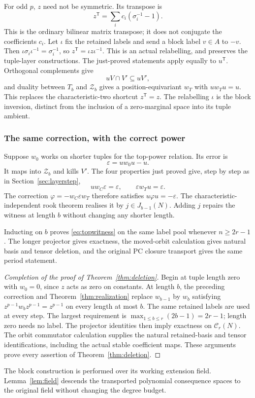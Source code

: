 For odd $p$, $z$ need not be symmetric. Its transpose is
\[z^{\mathsf T}=\sum_i c_i(\sigma_i^{-1}-1).
\]
This is the ordinary bilinear matrix transpose; it does not conjugate
the coefficients $c_i$.
Let $\iota$ fix the retained labels and send a block label $v\in A$ to $-v$. Then $\iota\sigma_i\iota^{-1}=\sigma_i^{-1}$, so $z^{\mathsf T}=\iota z\iota^{-1}$. This is an actual relabelling, and preserves the tuple-layer constructions. The just-proved statements apply equally to $u^{\mathsf T}$. Orthogonal complements give
\[uV\cap V'\subseteq uV',
\]
and duality between $T_b$ and $\mathcal Z_b$ gives a position-equivariant $w_T$ with $uw_Tu=u$. This replaces the characteristic-two shortcut $z^{\mathsf T}=z$.
The relabelling $\iota$ is the block inversion, distinct from the
inclusion of a zero-marginal space into its tuple ambient.

\subsubsection{The same correction, with the correct power}
Suppose $w_0$ works on shorter tuples for the top-power relation. Its error is
\[\varepsilon=uw_0u-u.
\]
It maps into $\mathcal Z_b$ and kills $V'$. The four properties just proved give, step by step as in Section~\ref{sec:layerstep},
\[uw_C\varepsilon=\varepsilon,\qquad\varepsilon w_Tu=\varepsilon.
\]
The correction $\varphi=-w_C\varepsilon w_T$ therefore satisfies $u\varphi u=-\varepsilon$. The characteristic-independent rook theorem realises it by $j\in J_{b-1}(N)$. Adding $j$ repairs the witness at length $b$ without changing any shorter length.

Inducting on $b$ proves \eqref{eq:topwitness} on the same label pool whenever $n\ge2r-1$. The longer projector gives exactness, the moved-orbit calculation gives natural basis and tensor deletion, and the original PC closure transport gives the same period statement.


\begin{proof}[Completion of the proof of Theorem~\ref{thm:deletion}]
Begin at tuple length zero with $w_0=0$, since $z$ acts as zero on
constants. At length $b$, the preceding correction and
Theorem~\ref{thm:realization} replace $w_{b-1}$ by $w_b$ satisfying
$z^{p-1}w_bz^{p-1}=z^{p-1}$ on every length at most $b$. The same
retained labels are used at every step. The largest requirement is
$\max_{1\le b\le r}(2b-1)=2r-1$; length zero needs no label.
The projector identities then imply exactness on $\mathcal C_r(N)$.
The orbit commutator calculation supplies the natural retained-basis
and tensor identifications, including the actual stable coefficient
maps. These arguments prove every assertion of Theorem~\ref{thm:deletion}.
\end{proof}
The block construction is performed over its working extension field.
Lemma~\ref{lem:field} descends the transported polynomial consequence
spaces to the original field without changing the degree budget.
